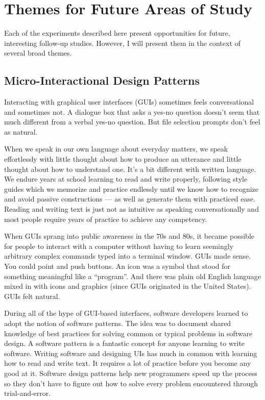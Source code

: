 \section{Themes for Future Areas of Study}
\label{themesforfutureareasofstudy}

Each of the experiments described here present opportunities for future, interesting follow-up studies. However, I will present them in the context of several broad themes.

\subsection{Micro-Interactional Design Patterns}
\label{micro-interactionaldesignpatterns}

Interacting with graphical user interfaces (GUIs) sometimes feels conversational and sometimes not. A dialogue box that asks a yes-no question doesn't seem that much different from a verbal yes-no question. But file selection prompts don't feel as natural.

When we speak in our own language about everyday matters, we speak effortlessly with little thought about how to produce an utterance and little thought about how to understand one. It's a bit different with written language. We endure years at school learning to read and write properly, following style guides which we memorize and practice endlessly until we know how to recognize and avoid passive constructions --- as well as generate them with practiced ease. Reading and writing text is just not as intuitive as speaking conversationally and most people require years of practice to achieve any competency.

When GUIs sprang into public awareness in the 70s and 80s, it became possible for people to interact with a computer without having to learn seemingly arbitrary complex commands typed into a terminal window. GUIs made sense. You could point and push buttons. An icon was a symbol that stood for something meaningful like a ``program''. And there was plain old English language mixed in with icons and graphics (since GUIs originated in the United States). GUIs felt natural.

During all of the hype of GUI-based interfaces, software developers learned to adopt the notion of software patterns. The idea was to document shared knowledge of best practices for solving common or typical problems in software design. A software pattern is a fantastic concept for anyone learning to write software. Writing software and designing UIs has much in common with learning how to read and write text. It requires a lot of practice before you become any good at it. Software design patterns help new programmers speed up the process so they don't have to figure out how to solve every problem encountered through trial-and-error.

